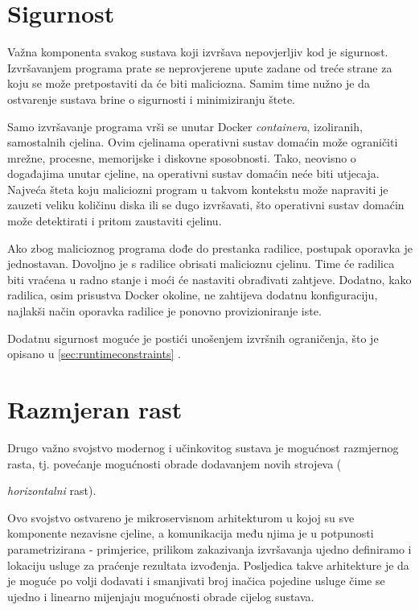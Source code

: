 \documentclass[times, utf8, zavrsni]{fer}
\begin{document}
{\section{Sigurnost}

Važna komponenta svakog sustava koji izvršava nepovjerljiv kod je sigurnost. Izvršavanjem programa prate se neprovjerene upute zadane od treće strane za koju se može pretpostaviti da će biti maliciozna. Samim time nužno je da ostvarenje sustava brine o sigurnosti i minimiziranju štete.

Samo izvršavanje programa vrši se unutar Docker {\textit{containera}}, izoliranih, samostalnih cjelina. Ovim cjelinama operativni sustav domaćin može ograničiti mrežne, procesne, memorijske i diskovne sposobnosti. Tako, neovisno o događajima unutar cjeline, na operativni sustav domaćin neće biti utjecaja. Najveća šteta koju maliciozni program u takvom kontekstu može napraviti je zauzeti veliku količinu diska ili se dugo izvršavati, što operativni sustav domaćin može detektirati i pritom zaustaviti cjelinu.

Ako zbog malicioznog programa dođe do prestanka radilice, postupak oporavka je jednostavan. Dovoljno je s radilice obrisati malicioznu cjelinu. Time će radilica biti vraćena u radno stanje i moći će nastaviti obrađivati zahtjeve. Dodatno, kako radilica, osim prisustva Docker okoline, ne zahtijeva dodatnu konfiguraciju, najlakši način oporavka radilice je ponovno provizioniranje iste.

Dodatnu sigurnost moguće je postići unošenjem izvršnih ograničenja, što je opisano u \ref{sec:runtimeconstraints} .

\section{Razmjeran rast}

Drugo važno svojstvo modernog i učinkovitog sustava je mogućnost razmjernog rasta, tj. povećanje mogućnosti obrade dodavanjem novih strojeva ({\textit{horizontalni} rast).

Ovo svojstvo ostvareno je mikroservisnom arhitekturom u kojoj su sve komponente nezavisne cjeline, a komunikacija među njima je u potpunosti parametrizirana - primjerice, prilikom zakazivanja izvršavanja ujedno definiramo i lokaciju usluge za praćenje rezultata izvođenja. Posljedica takve arhitekture je da je moguće po volji dodavati i smanjivati broj inačica pojedine usluge čime se ujedno i linearno mijenjaju mogućnosti obrade cijelog sustava.

}}
\end{document}
